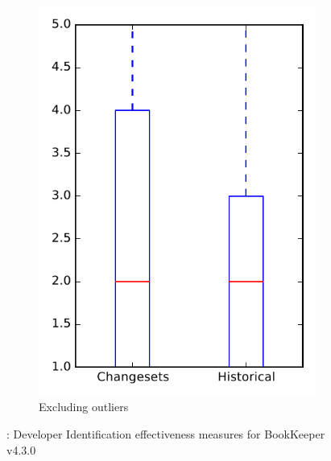 \begin{figure}
\begin{subfigure}{.4\textwidth}
        \includegraphics[height=0.4\textheight]{figures/dit/rq2_bookkeeper_no_outlier}
        \caption{Excluding outliers}\label{fig:dit:rq2:bookkeeper_no_outlier}
    \end{subfigure}
\caption{\dtwo: Developer Identification effectiveness measures for BookKeeper v4.3.0}
\label{fig:dit:rq2:bookkeeper}
\end{figure}
